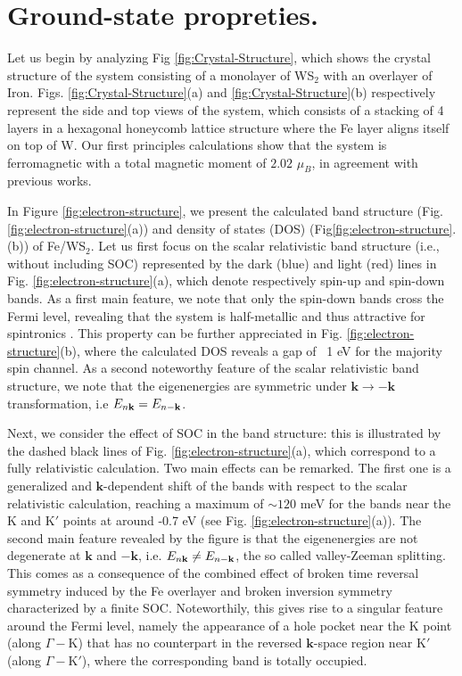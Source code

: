 \documentclass[aps,prb,showpacs,preprintnumbers,twocolumn,amsmath,amssymb]{revtex4-1}
\begin{document}
\section{Ground-state propreties.} Let us begin by analyzing Fig \ref{fig:Crystal-Structure}, which shows the crystal structure of the system consisting of a monolayer of WS$_{2}$ with an overlayer of Iron. Figs. \ref{fig:Crystal-Structure}(a) and \ref{fig:Crystal-Structure}(b) respectively represent the side and top views of the system, which consists of a stacking of 4 layers in a hexagonal honeycomb lattice structure where the Fe layer aligns itself on top of W. 
Our first principles calculations show that the system is ferromagnetic with a total magnetic moment of $2.02$ $\mu_{B}$, in agreement with previous works\cite{Polesya2016}. 
\

In Figure \ref{fig:electron-structure}, we present the calculated band structure (Fig. \ref{fig:electron-structure}(a)) and density of states (DOS) (Fig\ref{fig:electron-structure}.(b)) of Fe/WS$_2$. Let us first focus on the scalar relativistic band structure (i.e., without including SOC) represented by the dark (blue) and light (red) lines in Fig. \ref{fig:electron-structure}(a), which denote respectively spin-up and spin-down bands. As a first main feature, we note that only the spin-down bands cross the Fermi level, revealing that the system is half-metallic and thus attractive for spintronics \cite{HalfMet,Schmitt1987,Wolf2001,Fong2012,Jourdan2014}. This property can be further appreciated in Fig. \ref{fig:electron-structure}(b), where the calculated DOS reveals a gap of ~1 eV for the majority spin channel. As a second noteworthy feature of the scalar relativistic band structure, we note that the eigenenergies are symmetric under $\textbf{k}\rightarrow-\textbf{k}$ transformation, i.e $E_{n\bf k}=E_{n-\bf k}$.

 
 Next, we consider the effect of SOC in the band structure: this is illustrated by the dashed black lines of Fig. \ref{fig:electron-structure}(a), which correspond to a fully relativistic calculation. Two main effects can be remarked. The first one is a generalized and $\textbf{k}$-dependent shift of the bands with respect to the scalar relativistic calculation, reaching a maximum of $\sim120$ meV for the bands near the K and K$'$ points at around -0.7 eV (see Fig. \ref{fig:electron-structure}(a)). The second main feature revealed by the figure is that the eigenenergies are not degenerate at  $\textbf{k}$ and $-\textbf{k}$, i.e. $E_{n\bf k}\neq E_{n-\bf k}$, the so called valley-Zeeman splitting. This comes as a consequence of the combined effect of broken time reversal symmetry induced by the Fe overlayer and broken inversion symmetry characterized by a finite SOC\cite{Schaibley2016}. Noteworthily, this gives rise to a singular feature around the Fermi level, namely the appearance of a hole pocket near the K point (along $\Gamma-$K) that has no counterpart in the reversed  $\textbf{k}$-space region near K$'$ (along $\Gamma-$K$'$), where the corresponding band is totally occupied. 
\end{document}
